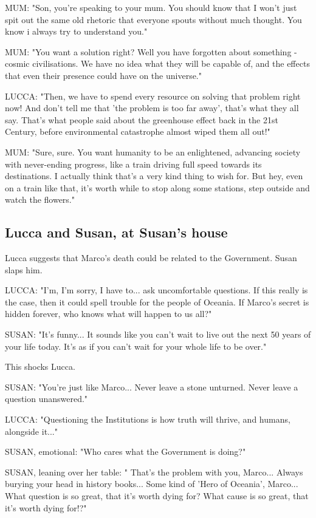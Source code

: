 \documentclass[11pt]{article}
\begin{document}
MUM: "Son, you're speaking to your mum. You should know that I won't just spit out the same old rhetoric that everyone spouts without much thought.
You know i always try to understand you."

MUM: "You want a solution right? Well you have forgotten about something - cosmic civilisations. 
We have no idea what they will be capable of, and the effects that even their presence could have on the universe."

LUCCA: "Then, we have to spend every resource on solving that problem right now! And don't tell me that 'the problem is too far away', that's what they all say. That's what people said about the greenhouse effect back in the 21st Century, before environmental catastrophe almost wiped them all out!"

MUM: "Sure, sure. You want humanity to be an enlightened, advancing society with never-ending progress, like a train driving full speed towards its destinations. I actually think that's a very kind thing to wish for.
But hey, even on a train like that, it's worth while to stop along some stations, step outside and watch the flowers."

	\subsection{Lucca and Susan, at Susan's house}

Lucca suggests that Marco's death could be related to the Government.
Susan slaps him. 

LUCCA: "I'm, I'm sorry, I have to... ask uncomfortable questions.
If this really is the case, then it could spell trouble for the people of Oceania. 
If Marco's secret is hidden forever, who knows what will happen to us all?"

SUSAN: "It's funny... It sounds like you can't wait to live out the next 50 years of your life today. It's as if you can't wait for your whole life to be over."

This shocks Lucca.

SUSAN: "You're just like Marco... 
Never leave a stone unturned. 
Never leave a question unanswered."

LUCCA: "Questioning the Institutions is how truth will thrive, and humans, alongside it..."

SUSAN, emotional: "Who cares what the Government is doing?"

SUSAN, leaning over her table: "
That's the problem with you, Marco...
Always burying your head in history books...
Some kind of 'Hero of Oceania', Marco...
What question is so great, that it's worth dying for?
What cause is so great, that it's worth dying for!?"
\end{document}
